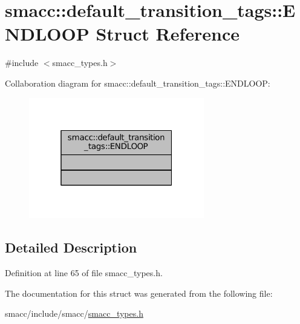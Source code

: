 \hypertarget{structsmacc_1_1default__transition__tags_1_1ENDLOOP}{}\section{smacc\+:\+:default\+\_\+transition\+\_\+tags\+:\+:E\+N\+D\+L\+O\+OP Struct Reference}
\label{structsmacc_1_1default__transition__tags_1_1ENDLOOP}


{\ttfamily \#include $<$smacc\+\_\+types.\+h$>$}



Collaboration diagram for smacc\+:\+:default\+\_\+transition\+\_\+tags\+:\+:E\+N\+D\+L\+O\+OP\+:
\nopagebreak
\begin{figure}[H]
\begin{center}
\leavevmode
\includegraphics[width=217pt]{structsmacc_1_1default__transition__tags_1_1ENDLOOP__coll__graph}
\end{center}
\end{figure}


\subsection{Detailed Description}


Definition at line 65 of file smacc\+\_\+types.\+h.



The documentation for this struct was generated from the following file\+:\begin{DoxyCompactItemize}
\item 
smacc/include/smacc/\hyperlink{smacc__types_8h}{smacc\+\_\+types.\+h}\end{DoxyCompactItemize}
